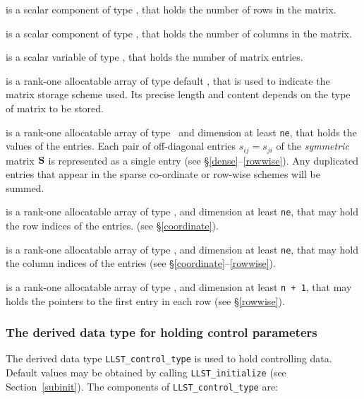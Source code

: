 \documentclass{galahad}
\newcommand{\packagename}{LLST}
\begin{document}
\begin{description}

 is a scalar component of type \integer,
that holds the number of rows in the matrix.

 is a scalar component of type \integer,
that holds the number of columns in the matrix.

 is a scalar variable of type \integer, that
holds the number of matrix entries.

 is a rank-one allocatable array of type default \character, that
is used to indicate the matrix storage scheme used. Its precise length and
content depends on the type of matrix to be stored.

 is a rank-one allocatable array of type \realdp\,
and dimension at least {\tt ne}, that holds the values of the entries.
Each pair of off-diagonal entries $s_{ij} = s_{ji}$ of the {\em symmetric}
matrix ${\mathbf{S}}$ is represented as a single entry
(see \S\ref{dense}--\ref{rowwise}).
Any duplicated entries that appear in the sparse
co-ordinate or row-wise schemes will be summed.

 is a rank-one allocatable array of type \integer,
and dimension at least {\tt ne}, that may hold the row indices of the entries.
(see \S\ref{coordinate}).

 is a rank-one allocatable array of type \integer,
and dimension at least {\tt ne}, that may hold the column indices of the entries
(see \S\ref{coordinate}--\ref{rowwise}).

 is a rank-one allocatable array of type \integer,
and dimension at least {\tt n + 1}, that may holds the pointers to
the first entry in each row (see \S\ref{rowwise}).

\end{description}


\subsubsection{The derived data type for holding control
 parameters}\label{typecontrol}
The derived data type
{\tt \packagename\_control\_type}
is used to hold controlling data. Default values may be obtained by calling
{\tt \packagename\_initialize}
(see Section~\ref{subinit}). The components of
{\tt \packagename\_control\_type}
are:
\end{document}
